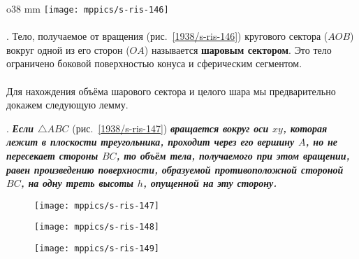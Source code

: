{

\begin{wrapfigure}{o}{38 mm}
\vskip-0mm
\centering
\texttt{[image: mppics/s-ris-146]}
\caption{}\label{1938/s-ris-146}
\vskip-0mm
\end{wrapfigure}

\paragraph{}\label{1938/s140}
\mbox{.}
Тело, получаемое от вращения (рис.~\ref{1938/s-ris-146}) кругового сектора ($AOB$) вокруг одной из его сторон ($OA$) называется \textbf{шаровым сектором}.
Это тело ограничено боковой поверхностью конуса и сферическим сегментом.



\paragraph{}\label{1938/s141}
Для нахождения объёма шарового сектора и целого шара мы предварительно докажем следующую лемму.

}


\medskip

\mbox{.}
\textbf{\emph{Если $\triangle ABC$}} (рис.~\ref{1938/s-ris-147}) \textbf{\emph{вращается вокруг оси $xy$, которая лежит в плоскости треугольника, проходит через его вершину $A$, но не пересекает стороны $BC$, то объём тела, получаемого при этом вращении, равен произведению поверхности, образуемой противоположной стороной $BC$, на одну треть высоты $h$, опущенной на эту сторону.}}

\begin{figure}[h!]
\begin{minipage}{.32\textwidth}
\centering
\texttt{[image: mppics/s-ris-147]}
\end{minipage}
\hfill
\begin{minipage}{.32\textwidth}
\centering
\texttt{[image: mppics/s-ris-148]}
\end{minipage}
\hfill
\begin{minipage}{.32\textwidth}
\centering
\texttt{[image: mppics/s-ris-149]}
\end{minipage}

\medskip

\begin{minipage}{.32\textwidth}
\centering
\caption{}\label{1938/s-ris-147}
\end{minipage}
\hfill
\begin{minipage}{.32\textwidth}
\centering
\caption{}\label{1938/s-ris-148}
\end{minipage}
\hfill
\begin{minipage}{.32\textwidth}
\centering
\caption{}\label{1938/s-ris-149}
\end{minipage}
\vskip-4mm
\end{figure}

